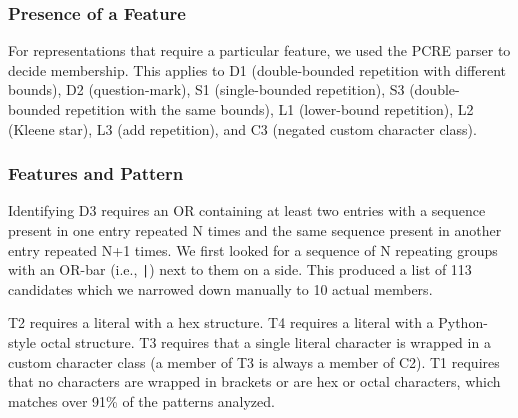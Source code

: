 \subsubsection{Presence of a Feature}
For representations that require a particular feature, we used the PCRE parser to decide membership. This applies to D1 (double-bounded repetition with different bounds), D2 (question-mark), S1 (single-bounded repetition), S3 (double-bounded repetition with the same bounds), L1 (lower-bound repetition), L2 (Kleene star), L3 (add repetition), and C3 (negated custom character class).

%





\subsubsection{Features and Pattern}
Identifying D3 requires an OR containing at least two entries with a sequence present in one entry repeated N times and the same sequence present in another entry repeated N+1 times. We first looked for a sequence of N repeating groups with an OR-bar (i.e., \verb!|!) next to them on a side. This produced a list of 113 candidates which we narrowed down manually to 10 actual members.


T2 requires a literal with a hex structure. %
T4 requires a literal with a %
Python-style octal structure. %
T3 requires that a single literal character is wrapped in a custom character class (a member of T3 is always a member of C2).
T1 requires that no characters are wrapped in brackets or are hex or octal characters, which matches over 91\% of the patterns analyzed.

